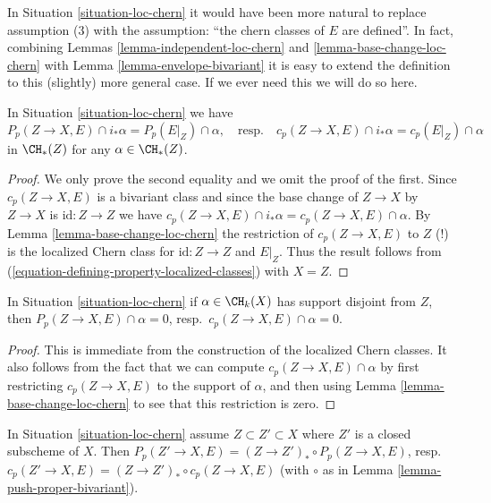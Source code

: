 \begin{remark}
\label{remark-loc-chern}
In Situation \ref{situation-loc-chern} it would have been more natural
to replace assumption (3) with the assumption: ``the chern classes
of $E$ are defined''. In fact, combining
Lemmas \ref{lemma-independent-loc-chern} and
\ref{lemma-base-change-loc-chern}
with Lemma \ref{lemma-envelope-bivariant}
it is easy to extend the definition to this (slightly) more general case.
If we ever need this we will do so here.
\end{remark}

\begin{lemma}
\label{lemma-loc-chern-after-pushforward}
In Situation \ref{situation-loc-chern} we have
$$
P_p(Z \to X, E) \cap i_*\alpha = P_p(E|_Z) \cap \alpha,
\quad\text{resp.}\quad
c_p(Z \to X, E) \cap i_*\alpha = c_p(E|_Z) \cap \alpha
$$
in $\CH_*(Z)$ for any $\alpha \in \CH_*(Z)$.
\end{lemma}

\begin{proof}
We only prove the second equality and we omit the proof of the first.
Since $c_p(Z \to X, E)$ is a bivariant class and since the base
change of $Z \to X$ by $Z \to X$ is $\text{id} : Z \to Z$ we have
$c_p(Z \to X, E) \cap i_*\alpha = c_p(Z \to X, E) \cap \alpha$.
By Lemma \ref{lemma-base-change-loc-chern} the restriction of
$c_p(Z \to X, E)$ to $Z$ (!) is the localized Chern class for
$\text{id} : Z \to Z$ and $E|_Z$. Thus the result follows from
(\ref{equation-defining-property-localized-classes}) with $X = Z$.
\end{proof}

\begin{lemma}
\label{lemma-loc-chern-disjoint}
In Situation \ref{situation-loc-chern}
if $\alpha \in \CH_k(X)$ has support disjoint from $Z$, then
$P_p(Z \to X, E) \cap \alpha = 0$, resp.\ $c_p(Z \to X, E) \cap \alpha = 0$.
\end{lemma}

\begin{proof}
This is immediate from the construction of the localized Chern classes.
It also follows from the fact that we can compute
$c_p(Z \to X, E) \cap \alpha$ by first restricting $c_p(Z \to X, E)$ to
the support of $\alpha$, and then using
Lemma \ref{lemma-base-change-loc-chern}
to see that this restriction is zero.
\end{proof}

\begin{lemma}
\label{lemma-loc-chern-shrink-Z}
In Situation \ref{situation-loc-chern}
assume $Z \subset Z' \subset X$ where $Z'$ is a closed subscheme of $X$.
Then
$P_p(Z' \to X, E) = (Z \to Z')_* \circ P_p(Z \to X, E)$,
resp.\ $c_p(Z' \to X, E) = (Z \to Z')_* \circ c_p(Z \to X, E)$
(with $\circ$ as in Lemma \ref{lemma-push-proper-bivariant}).
\end{lemma}

